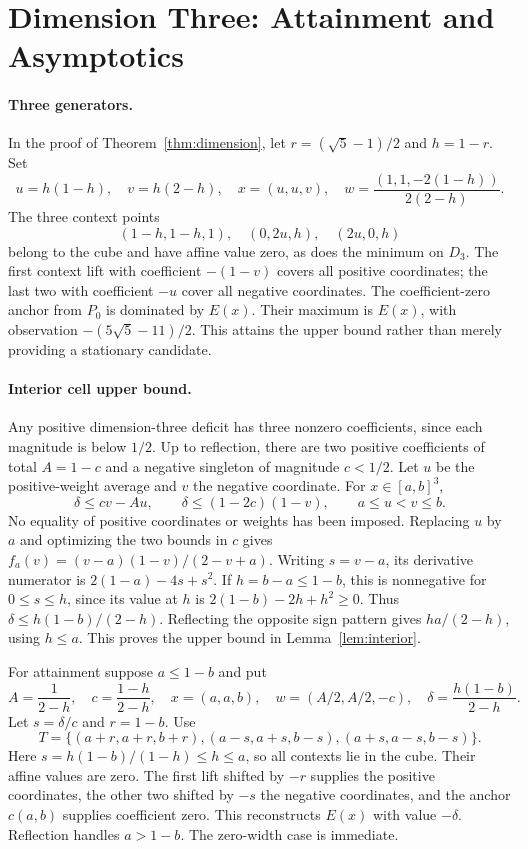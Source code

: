 \section{Dimension Three: Attainment and Asymptotics}\label{app:three}
\paragraph{Three generators.}
In the proof of Theorem~\ref{thm:dimension}, let $r=(\sqrt5-1)/2$ and $h=1-r$. Set
\[
u=h(1-h),\quad v=h(2-h),\quad x=(u,u,v),\quad
w=\frac{(1,1,-2(1-h))}{2(2-h)}.
\]
The three context points
\[
(1-h,1-h,1),\quad(0,2u,h),\quad(2u,0,h)
\]
belong to the cube and have affine value zero, as does the minimum on $D_3$. The first context lift with coefficient $-(1-v)$ covers all positive coordinates; the last two with coefficient $-u$ cover all negative coordinates. The coefficient-zero anchor from $P_0$ is dominated by $E(x)$. Their maximum is $E(x)$, with observation $-(5\sqrt5-11)/2$. This attains the upper bound rather than merely providing a stationary candidate.

\paragraph{Interior cell upper bound.}
Any positive dimension-three deficit has three nonzero coefficients, since each magnitude is below $1/2$. Up to reflection, there are two positive coefficients of total $A=1-c$ and a negative singleton of magnitude $c<1/2$. Let $u$ be the positive-weight average and $v$ the negative coordinate. For $x\in[a,b]^3$,
\[
\delta\le cv-Au,\qquad \delta\le(1-2c)(1-v),\qquad a\le u<v\le b.
\]
No equality of positive coordinates or weights has been imposed. Replacing $u$ by $a$ and optimizing the two bounds in $c$ gives
$f_a(v)=(v-a)(1-v)/(2-v+a)$.
Writing $s=v-a$, its derivative numerator is $2(1-a)-4s+s^2$. If $h=b-a\le1-b$, this is nonnegative for $0\le s\le h$, since its value at $h$ is $2(1-b)-2h+h^2\ge0$. Thus $\delta\le h(1-b)/(2-h)$. Reflecting the opposite sign pattern gives $ha/(2-h)$, using $h\le a$. This proves the upper bound in Lemma~\ref{lem:interior}.

For attainment suppose $a\le1-b$ and put
\[
A=\frac1{2-h},\quad c=\frac{1-h}{2-h},\quad
x=(a,a,b),\quad w=(A/2,A/2,-c),\quad
\delta=\frac{h(1-b)}{2-h}.
\]
Let $s=\delta/c$ and $r=1-b$. Use
\[
T=\{(a+r,a+r,b+r),(a-s,a+s,b-s),(a+s,a-s,b-s)\}.
\]
Here $s=h(1-b)/(1-h)\le h\le a$, so all contexts lie in the cube. Their affine values are zero. The first lift shifted by $-r$ supplies the positive coordinates, the other two shifted by $-s$ the negative coordinates, and the anchor $c(a,b)$ supplies coefficient zero. This reconstructs $E(x)$ with value $-\delta$. Reflection handles $a>1-b$. The zero-width case is immediate.

